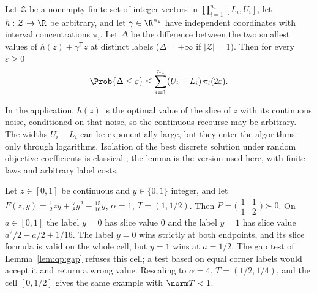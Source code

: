 \begin{lemma}\label{lem:qp:isolation}
Let $\mathcal Z$ be a nonempty finite set of integer vectors in
$\prod_{i=1}^{n_z}[L_i,U_i]$, let $h:\mathcal Z\to\R$ be arbitrary, and let
$\gamma\in\R^{n_z}$ have independent coordinates with interval concentrations
$\pi_i$. Let $\Delta$ be the difference between the two smallest values of
$h(z)+\gamma^{\mathsf T} z$ at distinct labels ($\Delta=+\infty$ if
$|\mathcal Z|=1$). Then for every $\varepsilon\ge0$
\[
 \Prob\{\Delta\le\varepsilon\}\le\sum_{i=1}^{n_z}(U_i-L_i)\,\pi_i(2\varepsilon).
\]
\end{lemma}

In the application, $h(z)$ is the optimal value of the slice of $z$ with its
continuous noise, conditioned on that noise, so the continuous recourse may
be arbitrary. The widths $U_i-L_i$ can be exponentially large, but they enter
the algorithms only through logarithms. Isolation of the best discrete
solution under random objective coefficients is classical
\cite{beier2006-typical-properties-of-winners-and,roglin2007-smoothed-analysis-of-integer-programming};
the lemma is the version used here, with finite laws and arbitrary label
costs.

\begin{example}\label{ex:qp:corner-labels}
Let $z\in[0,1]$ be continuous and $y\in\{0,1\}$ integer, and let
$F(z,y)=\frac12zy+\frac78y^2-\frac{15}{16}y$, $\alpha=1$, $T=(1,1/2)$. Then
$P=\bigl(\begin{smallmatrix}1&1\\1&2\end{smallmatrix}\bigr)\succ0$. On
$a\in[0,1]$ the label $y=0$ has slice value $0$ and the label $y=1$ has slice
value $a^2/2-a/2+1/16$. The label $y=0$ wins strictly at both endpoints, and
its slice formula is valid on the whole cell, but $y=1$ wins at $a=1/2$. The
gap test of Lemma~\ref{lem:qp:gap} refuses this cell; a test based on equal
corner labels would accept it and return a wrong value. Rescaling to
$\alpha=4$, $T=(1/2,1/4)$, and the cell $[0,1/2]$ gives the same example with
$\norm T<1$.
\end{example}

